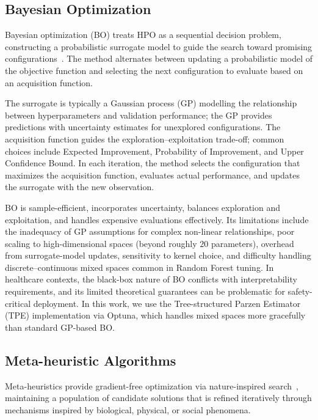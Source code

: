 \documentclass[letterpaper, 10 pt, conference]{ieeeconf}
\begin{document}
\subsection{Bayesian Optimization}

Bayesian optimization (BO) treats HPO as a sequential decision problem, constructing a probabilistic surrogate model to guide the search toward promising configurations~\cite{snoek2012, feurer2019}. The method alternates between updating a probabilistic model of the objective function and selecting the next configuration to evaluate based on an acquisition function.

The surrogate is typically a Gaussian process (GP) modelling the relationship between hyperparameters and validation performance; the GP provides predictions with uncertainty estimates for unexplored configurations. The acquisition function guides the exploration--exploitation trade-off; common choices include Expected Improvement, Probability of Improvement, and Upper Confidence Bound. In each iteration, the method selects the configuration that maximizes the acquisition function, evaluates actual performance, and updates the surrogate with the new observation.

BO is sample-efficient, incorporates uncertainty, balances exploration and exploitation, and handles expensive evaluations effectively. Its limitations include the inadequacy of GP assumptions for complex non-linear relationships, poor scaling to high-dimensional spaces (beyond roughly $20$ parameters), overhead from surrogate-model updates, sensitivity to kernel choice, and difficulty handling discrete--continuous mixed spaces common in Random Forest tuning. In healthcare contexts, the black-box nature of BO conflicts with interpretability requirements, and its limited theoretical guarantees can be problematic for safety-critical deployment. In this work, we use the Tree-structured Parzen Estimator (TPE) implementation via Optuna, which handles mixed spaces more gracefully than standard GP-based BO.

\subsection{Meta-heuristic Algorithms}

Meta-heuristics provide gradient-free optimization via nature-inspired search~\cite{alyasseri2020}, maintaining a population of candidate solutions that is refined iteratively through mechanisms inspired by biological, physical, or social phenomena.
\end{document}
